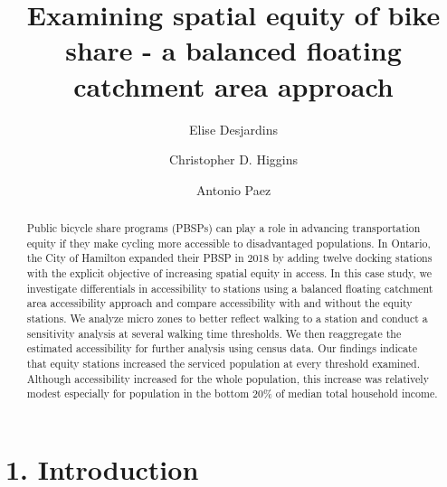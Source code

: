 \documentclass[]{elsarticle} %
\begin{document}
\begin{frontmatter}

  \title{Examining spatial equity of bike share - a balanced floating catchment
area approach}
    \author[McMaster University]{Elise Desjardins}
    \author[University of Toronto Scarborough]{Christopher D. Higgins}
    \author[McMaster University]{Antonio Paez}
      \address[McMaster University]{School of Earth, Environment \& Society, McMaster University, 1280 Main
Street West, Hamilton, ON L8S4L8}
    \address[University of Toronto Scarborough]{Department of Geography \& Planning, University of Toronto Scarborough,
1265 Military Trail, Toronto, ON M1C1A4}
  
  \begin{abstract}
  Public bicycle share programs (PBSPs) can play a role in advancing
  transportation equity if they make cycling more accessible to
  disadvantaged populations. In Ontario, the City of Hamilton expanded
  their PBSP in 2018 by adding twelve docking stations with the explicit
  objective of increasing spatial equity in access. In this case study, we
  investigate differentials in accessibility to stations using a balanced
  floating catchment area accessibility approach and compare accessibility
  with and without the equity stations. We analyze micro zones to better
  reflect walking to a station and conduct a sensitivity analysis at
  several walking time thresholds. We then reaggregate the estimated
  accessibility for further analysis using census data. Our findings
  indicate that equity stations increased the serviced population at every
  threshold examined. Although accessibility increased for the whole
  population, this increase was relatively modest especially for
  population in the bottom 20\% of median total household income.
  \end{abstract}
  
 \end{frontmatter}

\newpage

\hypertarget{introduction}{%
\section{1. Introduction}\label{introduction}}
\end{document}
